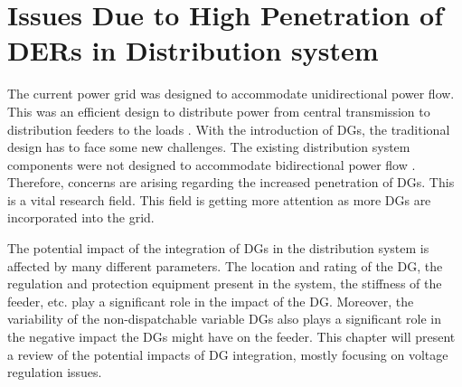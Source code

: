 \section{Issues Due to High Penetration of DERs in Distribution system}
The current power grid was designed to accommodate unidirectional power flow. This was an efficient design to distribute power from central transmission to distribution feeders to the loads \cite{HPPV}.  With the introduction of DGs, the traditional design has to face some new challenges. The existing distribution system components were not designed to accommodate bidirectional power flow \cite{HPPV}. Therefore, concerns are arising regarding the increased penetration of DGs. This is a vital research field. This field is getting more attention as more DGs are incorporated into the grid. 

The potential impact of the integration of DGs in the distribution system is affected by many different parameters. The location and rating of the DG, the regulation and protection equipment present in the system, the stiffness of the feeder, etc. play a significant role in the impact of the DG. Moreover, the variability of the non-dispatchable variable DGs also plays a significant role in the negative impact the DGs might have on the feeder. This chapter will present a review of the potential impacts of DG integration, mostly focusing on voltage regulation issues.

